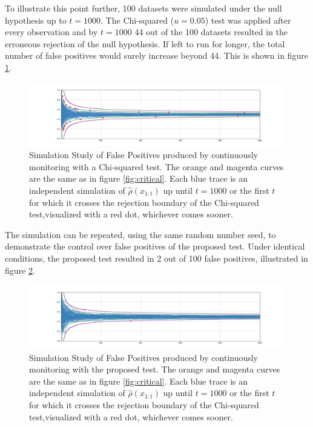 \documentclass[11pt]{article}
\begin{document}
  To illustrate this point further, 100 datasets were simulated under the null hypothesis up to $t=1000$. The Chi-squared ($u=0.05$) test was applied after every observation and by $t=1000$ 44 out of the 100 datasets resulted in the erroneous rejection of the null hypothesis. If left to run for longer, the total number of false positives would surely increase beyond 44. This is shown in figure \ref{fig:chi_fp}.
  \begin{figure}[h!]
  \centering
  \includegraphics[scale=0.35]{images/chi_fp.png}
  \caption{Simulation Study of False Positives produced by continuously monitoring with a Chi-squared test. The orange and magenta curves are the same as in figure \ref{fig:critical}. Each blue trace is an independent simulation of $\hat{\rho}(x_{1:t})$ up until $t=1000$ or the first $t$ for which it crosses the rejection boundary of the Chi-squared test,visualized with a red dot, whichever comes sooner. }
    \label{fig:chi_fp}
  \end{figure}
  The simulation can be repeated, using the same random number seed, to demonstrate the control over false positives of the proposed test. Under identical conditions, the proposed test resulted in 2 out of 100 false positives, illustrated in figure \ref{fig:ssrm_fp}.
    \begin{figure}[H]
  \centering
  \includegraphics[scale=0.35]{images/ssrm_fp.png}
  \caption{Simulation Study of False Positives produced by continuously monitoring with the proposed test. The orange and magenta curves are the same as in figure \ref{fig:critical}. Each blue trace is an independent simulation of $\hat{\rho}(x_{1:t})$ up until $t=1000$ or the first $t$ for which it crosses the rejection boundary of the Chi-squared test,visualized with a red dot, whichever comes sooner. }
    \label{fig:ssrm_fp}
  \end{figure}
\end{document}
